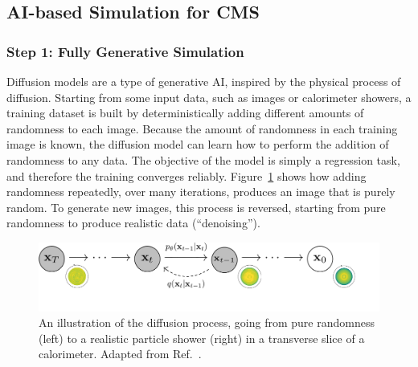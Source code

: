 \subsection{AI-based Simulation for CMS}

\subsubsection{Step 1: Fully Generative Simulation}\label{subsec:diffu}

Diffusion models are a type of generative AI, inspired by the physical process of diffusion.
Starting from some input data, such as images or calorimeter showers,
a training dataset is built by deterministically adding different amounts of randomness to each image.
Because the amount of randomness in each training image is known, the diffusion model can learn how to perform the addition of randomness to any data.
The objective of the model is simply a regression task, and therefore the training converges reliably.
Figure~\ref{fig:illus} shows how adding randomness repeatedly, over many iterations, produces an image that is purely random.
To generate new images, this process is reversed, starting from pure randomness to produce realistic data (``denoising'').

\begin{figure}[htb!]
\centering
\includegraphics[width=0.95\myfigurewidth]{figures/pgm_diagram_xarrow_showers.pdf}
\caption{An illustration of the diffusion process, going from pure randomness (left) to a realistic particle shower (right) in a transverse slice of a calorimeter. Adapted from Ref.~\cite{Ho:2020}.}
\label{fig:illus}
\end{figure}

